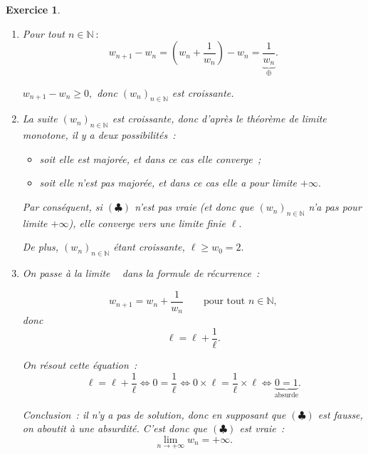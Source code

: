 \documentclass[10pt]{article}
\newtheorem{exo}{Exercice}
\begin{document}
\begin{exo}

 


\begin{enumerate}
\item Pour tout $n\in\mathbb{N}~:$
\[w_{n+1}-w_n=\left(w_n+\frac{1}{w_n}\right)-w_n=\frac{1}{\underbrace{w_n}_{\oplus}}.\]

\medskip

$w_{n+1}-w_n\geq 0,$ donc $\left(w_n\right)_{n\in\mathbb{N}}$ est croissante.

\item La suite $\left(w_n\right)_{n\in\mathbb{N}}$ est croissante, donc d'après le théorème de limite monotone, il y a deux possibilités~:

\begin{itemize}
\item[{\textbullet}] soit elle est majorée, et dans ce cas elle converge~;
\item[{\textbullet}] soit elle n'est pas majorée, et dans ce cas elle a pour limite $+\infty.$
\end{itemize}

\medskip

Par conséquent, si $(\clubsuit)$ n'est pas vraie (et donc que $\left(w_n\right)_{n\in\mathbb{N}}$ n'a pas pour limite $+\infty$), elle converge  vers une limite finie $\ell.$

\medskip

De plus, $\left(w_n\right)_{n\in\mathbb{N}}$ étant croissante, $\ell\geq w_0=2.$
\item On \og passe à la limite \fg~{} dans la formule de récurrence~:

\[w_{n+1}=w_n+\frac{1}{w_n}\qquad\text{pour tout }n\in\mathbb{N},\] donc
\[\ell=\ell+\frac{1}{\ell}.\]

On résout cette équation~:
\[\ell=\ell+\frac{1}{\ell} \iff 0=\frac{1}{\ell}\iff 0\times\ell=\frac{1}{\ell}\times\ell\iff \underbrace{0=1}_{\text{absurde}}.\]

\medskip

Conclusion~: il n'y a pas de solution, donc en supposant que $(\clubsuit)$ est fausse, on aboutit à une absurdité. C'est donc que $(\clubsuit)$ est vraie~: \[\lim\limits_{n\to +\infty}w_n=+\infty.\]

\end{enumerate}

\end{exo}
\end{document}
